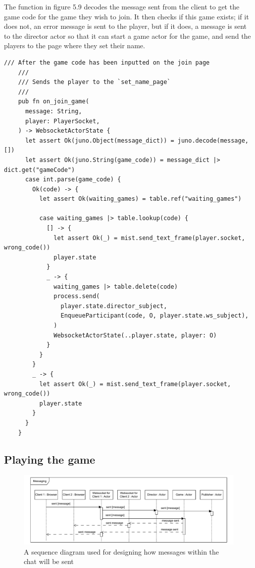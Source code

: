 \documentclass[]{final}
\begin{document}
\newpage

\begin{minipage}[t]{18em}
  The function in figure 5.9 decodes the message sent from the client to
  get the game code for the game they wish to join. It then checks if this game
  exists; if it does not, an error message is sent to the player, but if it does,
  a message is sent to the director actor so that it can start a game actor for the game,
  and send the players to the page where they set their name.
\end{minipage}
\hfill
\begin{minipage}[t]{20em}
  \begin{lstlisting}[language=gleam]
    /// After the game code has been inputted on the join page
    ///
    /// Sends the player to the `set_name_page`
    ///
    pub fn on_join_game(
      message: String,
      player: PlayerSocket,
    ) -> WebsocketActorState {
      let assert Ok(juno.Object(message_dict)) = juno.decode(message, [])
      let assert Ok(juno.String(game_code)) = message_dict |> dict.get("gameCode")
      case int.parse(game_code) {
        Ok(code) -> {
          let assert Ok(waiting_games) = table.ref("waiting_games")

          case waiting_games |> table.lookup(code) {
            [] -> {
              let assert Ok(_) = mist.send_text_frame(player.socket, wrong_code())
              player.state
            }
            _ -> {
              waiting_games |> table.delete(code)
              process.send(
                player.state.director_subject,
                EnqueueParticipant(code, O, player.state.ws_subject),
              )
              WebsocketActorState(..player.state, player: O)
            }
          }
        }
        _ -> {
          let assert Ok(_) = mist.send_text_frame(player.socket, wrong_code())
          player.state
        }
      }
    }
\end{lstlisting}
  \label{fig: 9}
\end{minipage}

\newpage
{}
\subsection{Playing the game}

\begin{figure}[ht!]
  \centering
  \includegraphics[width=0.9\linewidth]{sequence_messaging}
  \caption{A sequence diagram used for designing how messages within the chat will be sent}
  \label{fig: 10}
\end{figure}
\end{document}
